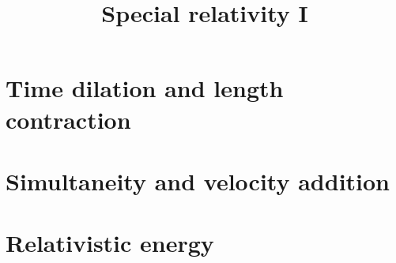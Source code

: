 \documentclass{handout}
\title{Special relativity I }
\begin{document}
\maketitle
\practiceinstructions


\section{Time dilation and length contraction}

\section{Simultaneity and velocity addition}

\section{Relativistic energy}
\end{document}
